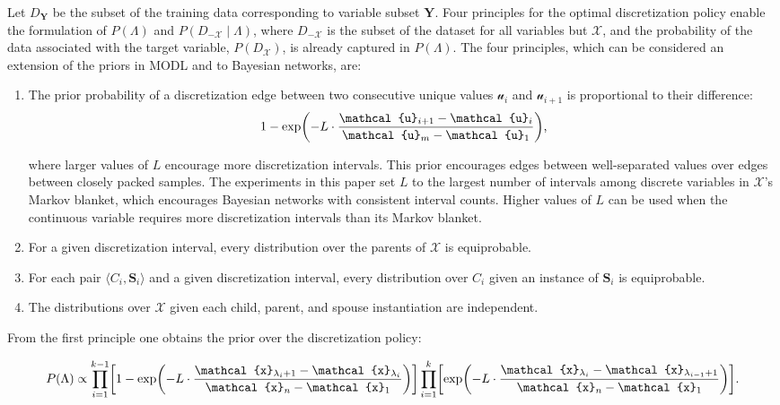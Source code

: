 \documentclass[twoside,11pt]{article}
\newcommand{\citep}[1]{\cite{#1}}
\newcommand{\citet}[1]{\citeauthor{#1} \citeyear{#1}}
\newcommand{\paren}[1]{\mathopen{}\mathclose\bgroup\left(#1\aftergroup\egroup\right)}
\newcommand{\brock}[1]{\mathopen{}\mathclose\bgroup\left[#1\aftergroup\egroup\right]}
\newcommand{\anglebrackets}[1]{\langle #1 \rangle}
\newcommand{\cX}{\mathcal{X}} %
\newcommand{\cx}{\mathcal{x}} %
\newcommand{\cu}{\mathcal{u}} %
\begin{document}
Let $D_{\bm{Y}}$ be the subset of the training data corresponding to variable subset $\bm{Y}$.
Four principles for the optimal discretization policy enable the formulation of $P(\Lambda)$ and $P(D_{-\cX} \mid \Lambda)$, where $D_{-\cX}$ is the subset of the dataset for all variables but $\cX$, and the probability of the data associated with the target variable, $P(D_{\cX})$, is already captured in $P(\Lambda)$.
The four principles, which can be considered an extension of the priors in MODL \citep{Boulle_2006} and \citet{Lustgarten_2011} to Bayesian networks, are:

\begin{enumerate}
\item The prior probability of a discretization edge between two consecutive unique values $\cu_i$ and $\cu_{i+1}$ is proportional to their difference:
  \begin{equation}
  1 - \exp \paren{- L \cdot \frac{\cu_{i+1} - \cu_i}{\cu_m - \cu_1}}\text{,}
  \end{equation}

where larger values of $L$ encourage more discretization intervals.
This prior encourages edges between well-separated values over edges between closely packed samples.
The experiments in this paper set $L$ to the largest number of intervals among discrete variables in $\cX$'s Markov blanket, which encourages Bayesian networks with consistent interval counts.
Higher values of $L$ can be used when the continuous variable requires more discretization intervals than its Markov blanket.

\item For a given discretization interval, every distribution over the parents of $\cX$ is equiprobable.
\item For each pair $\anglebrackets{C_i,\bm{S}_i}$ and a given discretization interval, every distribution over $C_i$ given an instance of $\bm{S}_i$ is equiprobable.
\item The distributions over $\cX$ given each child, parent, and spouse instantiation are independent.
\end{enumerate}

From the first principle one obtains the prior over the discretization policy:
\begin{small}
\begin{equation}
  \label{eq:p_M}
  P(\Lambda) \propto \prod_{i=1}^{k-1}
    \brock{
      1 - \exp\paren{
        - L \cdot \frac{
                         \cx_{\lambda_i +1} - \cx_{\lambda_i}
                       }{
                         \cx_n - \cx_1
                        }
      }
    }
    \prod_{i=1}^{k}
	\brock{
    \exp\paren{
      -L \cdot \frac{\cx_{\lambda_{i}} - \cx_{\lambda_{i-1} + 1}}{\cx_n - \cx_1}}
    }\text{.}
\end{equation}
\end{small}
\end{document}
